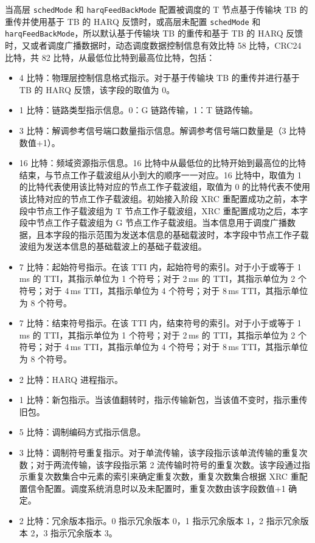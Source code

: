 \documentclass[11pt,a4paper]{ctexart}
\begin{document}
当高层 \texttt{schedMode} 和 \texttt{harqFeedBackMode} 配置被调度的 T 节点基于传输块 TB 的重传并使用基于 TB 的 HARQ 反馈时，或高层未配置 \texttt{schedMode} 和 \texttt{harqFeedBackMode}，所以默认基于传输块 TB 的重传和基于 TB 的 HARQ 反馈时，又或者调度广播数据时，动态调度数据控制信息有效比特 58 比特，CRC24 比特，共 82 比特，从最低位比特到最高位比特，包括：
\begin{itemize}[nosep]
  \item 4 比特：物理层控制信息格式指示。对于基于传输块 TB 的重传并进行基于 TB 的 HARQ 反馈，该字段的取值为 0。
  \item 1 比特：链路类型指示信息。0：G 链路传输，1：T 链路传输。
  \item 3 比特：解调参考信号端口数量指示信息。解调参考信号端口数量是（3 比特数值+1）。
  \item 16 比特：频域资源指示信息。16 比特中从最低位的比特开始到最高位的比特结束，与节点工作子载波组从小到大的顺序一一对应。16 比特中，取值为 1 的比特代表使用该比特对应的节点工作子载波组，取值为 0 的比特代表不使用该比特对应的节点工作子载波组。初始接入阶段 XRC 重配置成功之前，本字段中节点工作子载波组为 T 节点工作子载波组，XRC 重配置成功之后，本字段中节点工作子载波组为 G 节点工作子载波组。当本信息用于调度广播数据，且本字段的指示范围为发送本信息的基础载波时，本字段中节点工作子载波组为发送本信息的基础载波上的基础子载波组。
  \item 7 比特：起始符号指示。在该 TTI 内，起始符号的索引。对于小于或等于 1\,ms 的 TTI，其指示单位为 1 个符号；对于 2\,ms 的 TTI，其指示单位为 2 个符号；对于 4\,ms TTI，其指示单位为 4 个符号；对于 8\,ms TTI，其指示单位为 8 个符号。
  \item 7 比特：结束符号指示。在该 TTI 内，结束符号的索引。对于小于或等于 1\,ms 的 TTI，其指示单位为 1 个符号；对于 2\,ms 的 TTI，其指示单位为 2 个符号；对于 4\,ms TTI，其指示单位为 4 个符号；对于 8\,ms TTI，其指示单位为 8 个符号。
  \item 2 比特：HARQ 进程指示。
  \item 1 比特：新包指示。当该值翻转时，指示传输新包，当该值不变时，指示重传旧包。
  \item 5 比特：调制编码方式指示信息。
  \item 3 比特：调制符号重复指示。对于单流传输，该字段指示该单流传输的重复次数；对于两流传输，该字段指示第 2 流传输时符号的重复次数。该字段通过指示重复次数集合中元素的索引来确定重复次数，重复次数集合根据 XRC 重配置信令配置。调度系统消息时以及未配置时，重复次数由该字段数值+1 确定。
  \item 2 比特：冗余版本指示。0 指示冗余版本 0，1 指示冗余版本 1，2 指示冗余版本 2，3 指示冗余版本 3。

\end{itemize}
\end{document}
